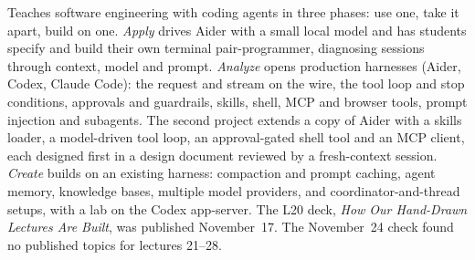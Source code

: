 \documentclass[10pt,oneside]{report}
\begin{document}
Teaches software engineering with coding agents in three phases: use one, take it apart, build on one.
\emph{Apply} drives Aider with a small local model and has students specify and build their own terminal pair-programmer, diagnosing sessions through context, model and prompt.
\emph{Analyze} opens production harnesses (Aider, Codex, Claude Code): the request and stream on the wire, the tool loop and stop conditions, approvals and guardrails, skills, shell, MCP and browser tools, prompt injection and subagents. The second project extends a copy of Aider with a skills loader, a model-driven tool loop, an approval-gated shell tool and an MCP client, each designed first in a design document reviewed by a fresh-context session.
\emph{Create} builds on an existing harness: compaction and prompt caching, agent memory, knowledge bases, multiple model providers, and coordinator-and-thread setups, with a lab on the Codex app-server.
The L20 deck, \emph{How Our Hand-Drawn Lectures Are Built}, was published November~17. The November~24 check found no published topics for lectures 21--28.
\end{document}
